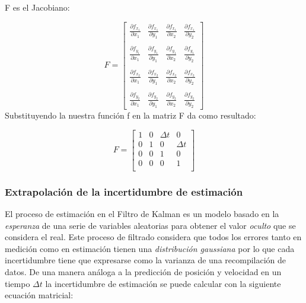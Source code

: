 F es el Jacobiano:

\begin{equation}
F =
\begin{bmatrix}
\frac{\partial f_{x_1}}{\partial x_1} & \frac{\partial f_{x_1}}{\partial y_1} & \frac{\partial f_{x_1}}{\partial x_2} & \frac{\partial f_{x_1}}{\partial y_2}\\
\\
\frac{\partial f_{y_1}}{\partial x_1} & \frac{\partial f_{y_1}}{\partial y_1} & \frac{\partial f_{y_1}}{\partial x_2} & \frac{\partial f_{y_1}}{\partial y_2}\\
\\
\frac{\partial f_{x_2}}{\partial x_1} & \frac{\partial f_{x_2}}{\partial y_1} & \frac{\partial f_{x_2}}{\partial x_2} & \frac{\partial f_{x_2}}{\partial y_2}\\
\\
\frac{\partial f_{y_2}}{\partial x_1} & \frac{\partial f_{y_2}}{\partial y_1} & \frac{\partial f_{y_2}}{\partial x_2} & \frac{\partial f_{y_2}}{\partial y_2}
\end{bmatrix}
\end{equation}
Substituyendo la nuestra función  f en la matriz F da como resultado:

\begin{equation}
F =
\begin{bmatrix}
1 & 0 & \Delta t & 0\\ 
0 & 1 & 0 & \Delta t\\
0 & 0 & 1 & 0\\
0 & 0 & 0 & 1\\
\end{bmatrix}
\end{equation}

		\subsubsection*{Extrapolación de la incertidumbre de estimación}
	El proceso de estimación en el Filtro de Kalman es un modelo basado en la \textit{esperanza} de una serie de variables aleatorias para obtener el valor \textit{oculto} que se considera el real. Este proceso de filtrado considera que todos los errores tanto en medición como en estimación tienen una \textit{distribución gaussiana} por lo que cada incertidumbre tiene que expresarse como la varianza de una recompilación de datos. De una manera análoga a la predicción de posición y velocidad en un tiempo $\Delta t$ la incertidumbre de estimación se puede calcular con la siguiente ecuación matricial:
	
